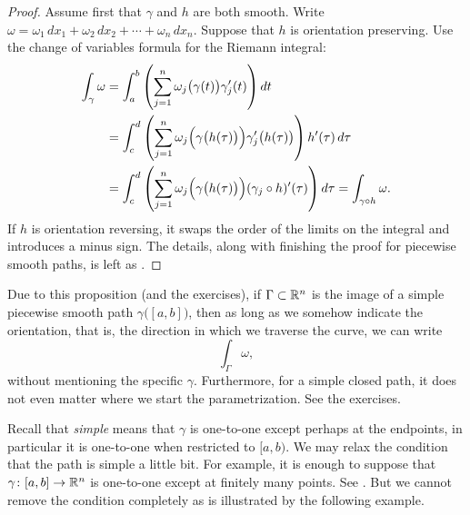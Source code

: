 \begin{proof}
Assume first that $\gamma$ and $h$ are both smooth.
Write $\omega = \omega_1 \, dx_1 + \omega_2 \, dx_2 + \cdots +
\omega_n \, dx_n$.
Suppose that $h$ is orientation preserving.  Use
the change of variables formula for the Riemann integral:
\begin{equation*}
\begin{split}
\int_{\gamma} \omega
& =
\int_a^b 
\left(
\sum_{j=1}^n
\omega_j\bigl(\gamma(t)\bigr) \gamma_j'(t)
\right) dt
\\
& =
\int_c^d 
\left(
\sum_{j=1}^n
\omega_j\Bigl(\gamma\bigl(h(\tau)\bigr)\Bigr) \gamma_j'\bigl(h(\tau)\bigr)
\right) h'(\tau) \, d\tau
\\
& =
\int_c^d 
\left(
\sum_{j=1}^n
\omega_j\Bigl(\gamma\bigl(h(\tau)\bigr)\Bigr) (\gamma_j \circ h)'(\tau)
\right) d\tau
=
\int_{\gamma \circ h} \omega .
\end{split}
\end{equation*}
If $h$ is orientation reversing, it swaps the order of the limits on the
integral and introduces a minus sign.
The details, along with finishing the proof for piecewise smooth
paths, is left as .
\end{proof}

Due to this proposition (and the exercises), if $\Gamma
\subset {\mathbb{R}}^n$ is the image of a simple piecewise smooth path
$\gamma\bigl([a,b]\bigr)$, then as long as we somehow indicate the orientation, that
is, the direction in which we traverse the curve, we can write
\begin{equation*}
\int_{\Gamma} \omega ,
\end{equation*}
without mentioning the specific $\gamma$.
Furthermore, for a simple closed path, it does not even matter where we
start the parametrization.  See the exercises.

Recall that \emph{simple} means that $\gamma$
is one-to-one except perhaps at the endpoints, in particular
it is one-to-one when restricted to $[a,b)$.
We may relax the condition that the path is simple a little bit.
For example, it is enough to suppose that
$\gamma \colon [a,b] \to {\mathbb{R}}^n$ is one-to-one except at finitely many points.
See .  But we cannot remove
the condition completely as is
illustrated by the following example.

